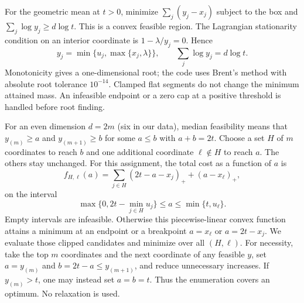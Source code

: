 \documentclass{article}
\begin{document}
For the geometric mean at $t>0$, minimize $\sum_j(y_j-x_j)$ subject to the box
and $\sum_j\log y_j\ge d\log t$. This is a convex feasible region. The
Lagrangian stationarity condition on an interior coordinate is
$1-\lambda/y_j=0$. Hence
\begin{equation}
 y_j=\min\{u_j,\max\{x_j,\lambda\}\},\qquad
 \sum_j\log y_j=d\log t.
\end{equation}
Monotonicity gives a one-dimensional root; the code uses Brent's method with
absolute root tolerance $10^{-14}$. Clamped flat segments do not change the
minimum attained mass. An infeasible endpoint or a zero cap at a positive
threshold is handled before root finding.

For an even dimension $d=2m$ (six in our data), median feasibility means that
$y_{(m)}\ge a$ and $y_{(m+1)}\ge b$ for some $a\le b$ with $a+b=2t$.
Choose a set $H$ of $m$ coordinates to reach $b$ and one additional coordinate
$\ell\notin H$ to reach $a$. The others stay unchanged. For this assignment,
the total cost as a function of $a$ is
\begin{equation}
 f_{H,\ell}(a)=\sum_{j\in H}(2t-a-x_j)_+ +(a-x_\ell)_+,
\end{equation}
on the interval
\begin{equation}
 \max\{0,2t-\min_{j\in H}u_j\}\le a\le\min\{t,u_\ell\}.
\end{equation}
Empty intervals are infeasible. Otherwise this piecewise-linear convex function
attains a minimum at an endpoint or a breakpoint $a=x_\ell$ or $a=2t-x_j$.
We evaluate those clipped candidates and minimize over all $(H,\ell)$.
For necessity, take the top $m$ coordinates and the next coordinate of any
feasible $y$, set $a=y_{(m)}$ and $b=2t-a\le y_{(m+1)}$, and reduce unnecessary
increases. If $y_{(m)}>t$, one may instead set $a=b=t$. Thus the enumeration
covers an optimum. No relaxation is used.
\end{document}
